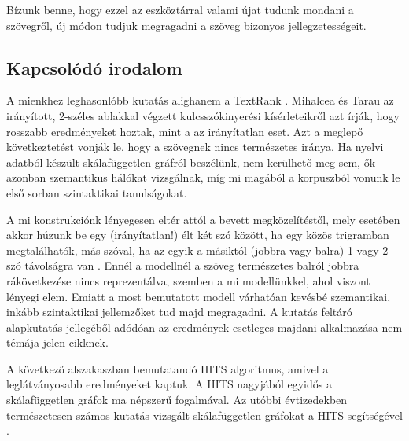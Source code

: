 \documentclass{llncs}
\newcommand{\nyil}{$\rightarrow$\ }
\newcommand{\embf}[1]{\textbf{#1}}
\newcommand{\XXX}[1]{{\small \color{megjcolor} [XXX #1]}}
\newcommand{\XXXb}[1]{\XXX{\embf{#1}}}
\begin{document}
Bízunk benne, hogy ezzel az eszköztárral
valami újat tudunk mondani a szövegről,
új módon tudjuk megragadni a szöveg bizonyos jellegzetességeit.

\subsection{Kapcsolódó irodalom}


A mienkhez leghasonlóbb kutatás alighanem a TextRank \cite{mihalcea2004textrank}.
Mihalcea és Tarau az irányított, 2-széles ablakkal végzett kulcsszókinyerési
kísérleteikről azt
írják, hogy rosszabb eredményeket hoztak, mint a az irányítatlan eset. Azt a
meglepő következtetést vonják le, hogy a szövegnek nincs természetes iránya.
Ha nyelvi adatból készült skálafüggetlen gráfról beszélünk, nem kerülhető meg
\cite{steyvers2005large} sem, ők azonban szemantikus hálókat vizsgálnak, míg mi
magából a korpuszból vonunk le első sorban szintaktikai tanulságokat.

A mi konstrukciónk lényegesen eltér attól a bevett megközelítéstől,
mely esetében akkor húzunk be egy (irányítatlan!) élt
két szó között, ha egy közös trigramban megtalálhatók,
más szóval, ha az egyik a másiktól (jobbra vagy balra)
1 vagy 2 szó távolságra van
\cite{cancho2001thesmall}.
Ennél a modellnél a szöveg természetes balról jobbra rákövetkezése
nincs reprezentálva,
szemben a mi modellünkkel, ahol viszont lényegi elem.
%
Emiatt a most bemutatott modell várhatóan kevésbé szemantikai,
inkább szintaktikai jellemzőket tud majd megragadni.
%
A kutatás feltáró alapkutatás jellegéből adódóan
az eredmények esetleges majdani alkalmazása nem témája jelen cikknek.

A következő alszakaszban bemutatandó HITS algoritmus, amivel a leglátványosabb
eredményeket kaptuk.  A HITS nagyjából egyidős a skálafüggetlen gráfok ma
népszerű fogalmával.  Az utóbbi évtizedekben természetesen számos kutatás
vizsgált skálafüggetlen gráfokat a HITS segítségével \cite{zhang2007expertise}.
\end{document}
